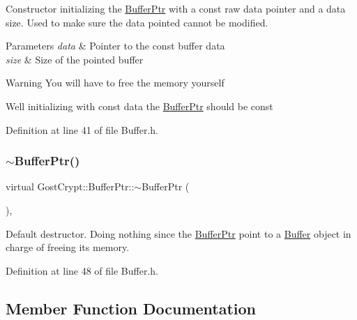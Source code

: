 Constructor initializing the \hyperlink{class_gost_crypt_1_1_buffer_ptr}{Buffer\+Ptr} with a const raw data pointer and a data size. Used to make sure the data pointed cannot be modified. 


\begin{DoxyParams}{Parameters}
{\em data} & Pointer to the const buffer data \\
\hline
{\em size} & Size of the pointed buffer \\
\hline
\end{DoxyParams}
\begin{DoxyWarning}{Warning}
You will have to free the memory yourself 

Well initializing with const data the \hyperlink{class_gost_crypt_1_1_buffer_ptr}{Buffer\+Ptr} should be const 
\end{DoxyWarning}


Definition at line 41 of file Buffer.\+h.

\mbox{\label{class_gost_crypt_1_1_buffer_ptr_a4558ae2ea321f4aa9ad5debd0aa85310}} 
\subsubsection{\texorpdfstring{$\sim$\+Buffer\+Ptr()}{~BufferPtr()}}
{\footnotesize\ttfamily virtual Gost\+Crypt\+::\+Buffer\+Ptr\+::$\sim$\+Buffer\+Ptr (\begin{DoxyParamCaption}{ }\end{DoxyParamCaption})\hspace{0.3cm}{\ttfamily [inline]}, {\ttfamily [virtual]}}



Default destructor. Doing nothing since the \hyperlink{class_gost_crypt_1_1_buffer_ptr}{Buffer\+Ptr} point to a \hyperlink{class_gost_crypt_1_1_buffer}{Buffer} object in charge of freeing its memory. 



Definition at line 48 of file Buffer.\+h.



\subsection{Member Function Documentation}
\mbox{\label{class_gost_crypt_1_1_buffer_ptr_af8322ddb56015cc17282704b45863223}} 
